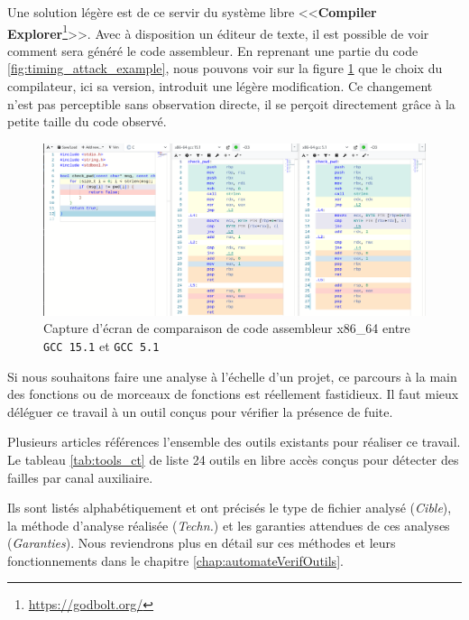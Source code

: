 Une solution légère est de ce servir du système libre <<\textbf{Compiler Explorer}\footnote{\url{https://godbolt.org/}}>>. Avec à disposition un éditeur de texte, il est possible de voir comment sera généré le code assembleur. En reprenant une partie du code \ref{fig:timing_attack_example}, nous pouvons voir sur la figure \ref{img:godbolt_example} que le choix du compilateur, ici sa version, introduit une légère modification. Ce changement n'est pas perceptible sans observation directe, il se perçoit directement grâce à la petite taille du code observé.

\begin{figure}[!h]
  \begin{adjustwidth}{-2.5cm}{-2cm}
    \centering
    \includegraphics[trim = 1mm 0mm 0mm 0mm, clip,width=0.9\paperwidth]{pictures/godbolt_example.png}
    \caption{Capture d'écran de comparaison de code assembleur x86\_64 entre \texttt{GCC 15.1} et \texttt{GCC 5.1}}
    \label{img:godbolt_example}
  \end{adjustwidth}
\end{figure}

Si nous souhaitons faire une analyse à l'échelle d'un projet, ce parcours à la main des fonctions ou de morceaux de fonctions est réellement fastidieux. Il faut mieux déléguer ce travail à un outil conçus pour vérifier la présence de fuite.\smallbreak

Plusieurs articles références l'ensemble des outils existants \cite{notThatHardCT, GeimerEvaluationsSideChannel} pour réaliser ce travail. Le tableau \ref{tab:tools_ct} de \citeauthor{notThatHardCT} liste 24 outils en libre accès conçus pour détecter des failles par canal auxiliaire.

Ils sont listés alphabétiquement et ont précisés le type de fichier analysé (\textit{Cible}), la méthode d'analyse réalisée (\textit{Techn.}) et les garanties attendues de ces analyses (\textit{Garanties}). Nous reviendrons plus en détail sur ces méthodes et leurs fonctionnements dans le chapitre \ref{chap:automateVerifOutils}.\medbreak

